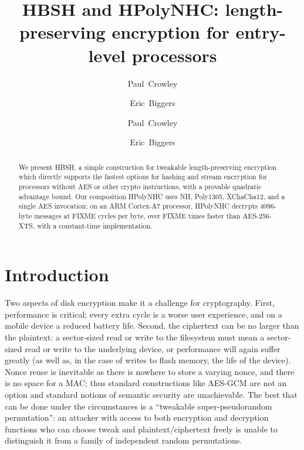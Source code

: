 \documentclass[journal=tosc,preprint,floatrow,submission]{iacrtrans}
\title{{HBSH} and {HPolyNHC}: length-preserving encryption for entry-level processors}
\author{Paul~Crowley \and Eric~Biggers}
\institute{Google LLC \\ \email[paulcrowley@google.com,ebiggers@google.com]{{paulcrowley,ebiggers}@google.com}}
\author{Paul~Crowley}
\author{Eric~Biggers}
\affil{Google LLC}
\begin{document}
\maketitle
\iftoggle{iacr}{
    \keywords{strong pseudorandom permutation \and
        variable input length \and
        tweakable encryption \and
        disk encryption}
}{ %
} %

\begin{abstract}
    We present HBSH, a simple construction for tweakable length-preserving encryption which
    directly supports the fastest options for hashing and stream encryption for processors
    without AES or other crypto instructions, with a provable
    quadratic advantage bound. Our composition HPolyNHC uses NH, Poly1305, XChaCha12,
    and a single AES invocation; on an ARM Cortex-A7 processor, HPolyNHC decrypts
    4096-byte messages at FIXME cycles per byte, over FIXME times faster than
    AES-256-XTS, with a constant-time implementation.
\iftoggle{iacr}{
}{

    This paper: \url{https://ia.cr/2018/720} \\
    Source: \url{https://github.com/google/hpolyc} \\
    Email: \href{mailto:paulcrowley@google.com,ebiggers@google.com}{\{paulcrowley,ebiggers\}@google.com}
}
\end{abstract}

\section{Introduction}
Two aspects of disk encryption make it a challenge for cryptography.  First,
performance is critical; every extra cycle is a worse user experience, and on a mobile device
a reduced battery life.  Second, the ciphertext can be no larger than the plaintext: a sector-sized
read or write to the filesystem must mean a sector-sized read or write to the underlying device,
or performance will again suffer greatly
(as well as, in the case of writes to flash memory, the life of the device).
Nonce reuse is inevitable as there is nowhere to store a varying nonce, and there is no space
for a MAC; thus standard constructions like AES-GCM are not an option and standard notions
of semantic security are unachievable.  The best that can be done under the circumstances is
a ``tweakable super-pseudorandom permutation'': an attacker with access to both encryption
and decryption functions who can choose tweak and plaintext/ciphertext freely is unable to
distinguish it from a family of independent random permutations.
\end{document}
